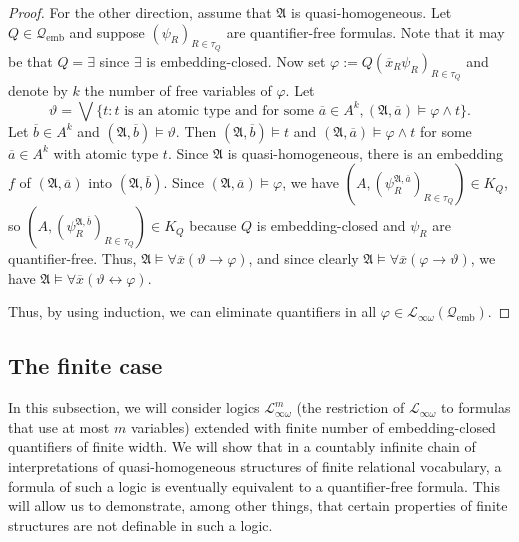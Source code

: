 \documentclass{ndjflart}
\theoremstyle{plain}
\theoremstyle{definition}
\numberwithin{equation}{section}
\DeclareMathOperator{\emb}{emb}
\begin{document}
\begin{proof}
For the other direction, assume that $\mathfrak{A}$ is quasi-homogeneous.
Let $Q \in \mathcal{Q}_{\emb}$ and suppose $(\psi_R)_{R \in \tau_Q}$ are
quantifier-free formulas.
Note that it may be that $Q = \exists$ since $\exists$ is embedding-closed.
Now set $\varphi := Q(\overline{x}_R\psi_R)_{R \in \tau_Q}$ and denote by $k$
the number of free variables of $\varphi$.
Let
\[
	\vartheta = \bigvee\{t \colon
	t \text{ is an atomic type and for some }
	\overline{a} \in A^k, (\mathfrak{A}, \overline{a}) \vDash \varphi \wedge t\}.
\]
Let $\overline{b} \in A^k$ and $(\mathfrak{A}, \overline{b}) \vDash \vartheta$.
Then $(\mathfrak{A},\overline{b}) \vDash t$ and
$(\mathfrak{A},\overline{a}) \vDash \varphi \wedge t$ for some
$\overline{a} \in A^k$ with atomic type $t$.
Since $\mathfrak{A}$ is quasi-homogeneous, there is an embedding $f$ of
$(\mathfrak{A},\overline{a})$ into $(\mathfrak{A},\overline{b})$.
Since $(\mathfrak{A},\overline{a}) \vDash \varphi$, we have
$(A,(\psi^{\mathfrak{A},\overline{a}}_R)_{R \in \tau_Q}) \in K_Q$,
so $(A,(\psi^{\mathfrak{A},\overline{b}}_R)_{R \in \tau_Q}) \in K_Q$
because $Q$ is embedding-closed and $\psi_R$ are quantifier-free.
Thus, $\mathfrak{A} \vDash \forall \overline{x}(\vartheta \rightarrow \varphi)$,
and since clearly
$\mathfrak{A} \vDash \forall \overline{x}(\varphi \rightarrow \vartheta)$,
we have
$\mathfrak{A} \vDash \forall \overline{x}(\vartheta \leftrightarrow \varphi)$.

Thus, by using induction, we can eliminate quantifiers in all
$\varphi \in \mathcal{L}_{\infty\omega}(\mathcal{Q}_{\emb})$.
\end{proof}


\subsection{The finite case}

In this subsection, we will consider logics $\mathcal{L}_{\infty\omega}^m$
(the restriction of $\mathcal{L}_{\infty\omega}$ to formulas that use at most
$m$ variables) extended with finite number of em\-bed\-ding-closed quantifiers
of finite width.
We will show that in a countably infinite chain of interpretations of
quasi-homogeneous structures
of finite relational vocabulary, a formula of such a logic is eventually
equivalent to a quantifier-free formula.
This will allow us to demonstrate, among other things, that certain properties
of finite structures are not definable in such a logic.
\end{document}
